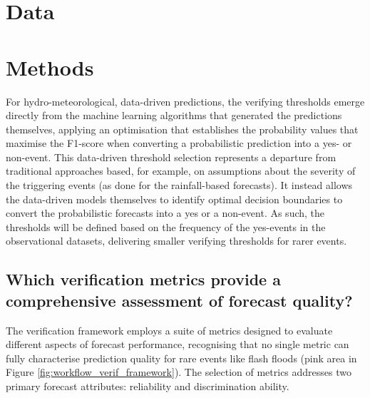 \section{Data}


\section{Methods}






For hydro-meteorological, data-driven predictions, the verifying thresholds emerge directly from the machine learning algorithms that generated the predictions themselves, applying an optimisation that establishes the probability values that maximise the F1-score when converting a probabilistic prediction into a yes- or non-event. This data-driven threshold selection represents a departure from traditional approaches based, for example, on assumptions about the severity of the triggering events (as done for the rainfall-based forecasts). It instead allows the data-driven models themselves to identify optimal decision boundaries to convert the probabilistic forecasts into a yes or a non-event. As such, the thresholds will be defined based on the frequency of the yes-events in the observational datasets, delivering smaller verifying thresholds for rarer events. 


\subsection{Which verification metrics provide a comprehensive assessment of forecast quality?}

The verification framework employs a suite of metrics designed to evaluate different aspects of forecast performance, recognising that no single metric can fully characterise prediction quality for rare events like flash floods (pink area in Figure \ref{fig:workflow_verif_framework}). The selection of metrics addresses two primary forecast attributes: reliability and discrimination ability.

